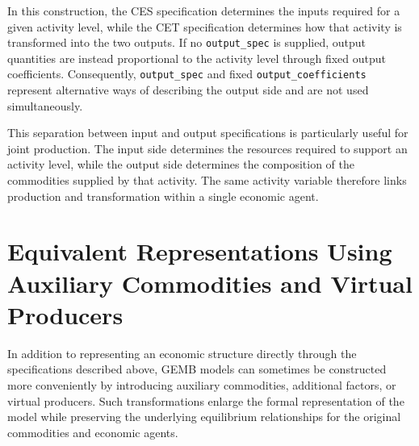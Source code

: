 \documentclass[
  letterpaper,
  DIV=11,
  numbers=noendperiod]{scrreprt}
\begin{document}
In this construction, the CES specification determines the inputs
required for a given activity level, while the CET specification
determines how that activity is transformed into the two outputs. If no
\texttt{output\_spec} is supplied, output quantities are instead
proportional to the activity level through fixed output coefficients.
Consequently, \texttt{output\_spec} and fixed
\texttt{output\_coefficients} represent alternative ways of describing
the output side and are not used simultaneously.

This separation between input and output specifications is particularly
useful for joint production. The input side determines the resources
required to support an activity level, while the output side determines
the composition of the commodities supplied by that activity. The same
activity variable therefore links production and transformation within a
single economic agent.

\section{Equivalent Representations Using Auxiliary Commodities and
Virtual
Producers}\label{equivalent-representations-using-auxiliary-commodities-and-virtual-producers}

In addition to representing an economic structure directly through the
specifications described above, GEMB models can sometimes be constructed
more conveniently by introducing auxiliary commodities, additional
factors, or virtual producers. Such transformations enlarge the formal
representation of the model while preserving the underlying equilibrium
relationships for the original commodities and economic agents.
\end{document}
